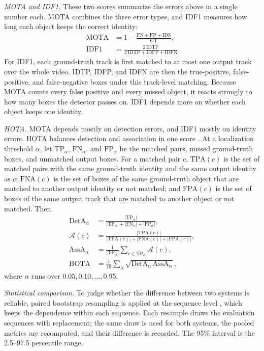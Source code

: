 \documentclass[journal]{new-aiaa}
\begin{document}
\emph{MOTA and IDF1.} These two scores summarize the errors above in a
single number each. MOTA combines the three error types, and IDF1 measures
how long each object keeps the correct identity:
\begin{align}
\mathrm{MOTA}&=1-\frac{\mathrm{FN}+\mathrm{FP}+\mathrm{IDS}}{\mathrm{GT}},\label{eq:mota}\\
\mathrm{IDF1}&=\frac{2\,\mathrm{IDTP}}{2\,\mathrm{IDTP}+\mathrm{IDFP}+\mathrm{IDFN}}\label{eq:idf1}
\end{align}
For IDF1, each ground-truth track is first matched to at most one output
track over the whole video. IDTP, IDFP, and IDFN are then the true-positive,
false-positive, and false-negative boxes under this track-level matching.
Because MOTA counts every false positive and every missed object, it reacts
strongly to how many boxes the detector passes on. IDF1 depends more on
whether each object keeps one identity.

\emph{HOTA.} MOTA depends mostly on detection errors, and IDF1 mostly on
identity errors. HOTA balances detection and association in one score
\cite{luiten2021hota}.
At a localization threshold $\alpha$, let $\mathrm{TP}_\alpha$,
$\mathrm{FN}_\alpha$, and $\mathrm{FP}_\alpha$ be the matched pairs, missed
ground-truth boxes, and unmatched output boxes. For a matched pair $c$,
$\mathrm{TPA}(c)$ is the set of matched pairs with the same ground-truth
identity and the same output identity as $c$; $\mathrm{FNA}(c)$ is the set of
boxes of the same ground-truth object that are matched to another output
identity or not matched; and $\mathrm{FPA}(c)$ is the set of boxes of the same
output track that are matched to another object or not matched. Then
\begin{align}
\mathrm{DetA}_\alpha&=\frac{|\mathrm{TP}_\alpha|}{|\mathrm{TP}_\alpha|+|\mathrm{FN}_\alpha|+|\mathrm{FP}_\alpha|},\label{eq:deta}\\
\mathcal{A}(c)&=\frac{|\mathrm{TPA}(c)|}{|\mathrm{TPA}(c)|+|\mathrm{FNA}(c)|+|\mathrm{FPA}(c)|},\label{eq:ac}\\
\mathrm{AssA}_\alpha&=\frac{1}{|\mathrm{TP}_\alpha|}\sum_{c\in\mathrm{TP}_\alpha}\mathcal{A}(c),\label{eq:assa}\\
\mathrm{HOTA}&=\frac{1}{19}\sum_{\alpha}\sqrt{\mathrm{DetA}_\alpha\,\mathrm{AssA}_\alpha},\label{eq:hota}
\end{align}
where $\alpha$ runs over $0.05, 0.10, \dots, 0.95$.

\emph{Statistical comparison.} To judge whether the difference between two
systems is reliable, paired bootstrap resampling is applied at the sequence
level \cite{efron1993bootstrap}, which keeps the dependence within each
sequence. Each resample draws the evaluation sequences with replacement; the
same draw is used for both systems, the pooled metrics are
recomputed, and their difference is recorded. The 95\% interval is the
2.5--97.5 percentile range.
\end{document}
